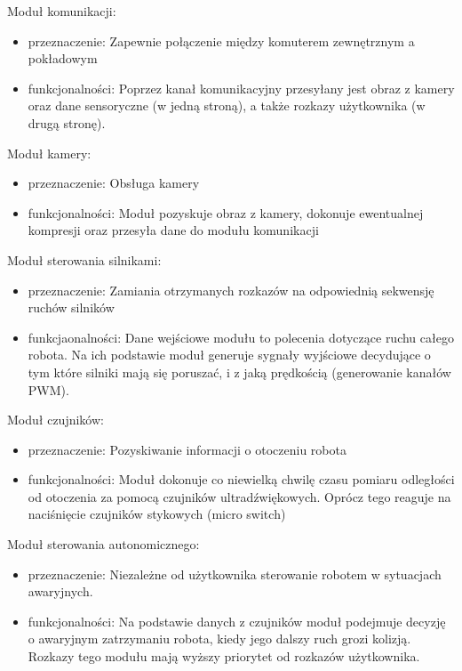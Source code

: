 \documentclass[a4paper]{article}
\begin{document}
Moduł komunikacji:
\begin{itemize}
\item przeznaczenie: Zapewnie połączenie między komuterem zewnętrznym a pokładowym
\item funkcjonalności: Poprzez kanał komunikacyjny przesyłany jest obraz z kamery oraz dane sensoryczne (w jedną stroną), a także rozkazy użytkownika (w drugą stronę). 
\end{itemize}

Moduł kamery:
\begin{itemize}
\item przeznaczenie: Obsługa kamery
\item funkcjonalności: Moduł pozyskuje obraz z kamery, dokonuje ewentualnej kompresji oraz przesyła dane do modułu komunikacji
\end{itemize}

Moduł sterowania silnikami:
\begin{itemize}
\item przeznaczenie: Zamiania otrzymanych rozkazów na odpowiednią sekwensję ruchów silników
\item funkcjaonalności: Dane wejściowe modułu to polecenia dotyczące ruchu całego robota. Na ich podstawie moduł generuje sygnały wyjściowe decydujące o tym które silniki mają się poruszać, i z jaką prędkością (generowanie kanałów PWM). 
\end{itemize}
\newpage
Moduł czujników:
\begin{itemize}
\item przeznaczenie: Pozyskiwanie informacji o otoczeniu robota
\item funkcjonalności: Moduł dokonuje co niewielką chwilę czasu pomiaru odległości od otoczenia za pomocą czujników ultradźwiękowych. Oprócz tego reaguje na naciśnięcie czujników stykowych (micro switch)
\end{itemize}

Moduł sterowania autonomicznego:
\begin{itemize}
\item przeznaczenie: Niezależne od użytkownika sterowanie robotem w sytuacjach awaryjnych. 
\item funkcjonalności: Na podstawie danych z czujników moduł podejmuje decyzję o awaryjnym zatrzymaniu robota, kiedy jego dalszy ruch grozi kolizją. Rozkazy tego modułu mają wyższy priorytet od rozkazów użytkownika. 
\end{itemize}

\end{document}
